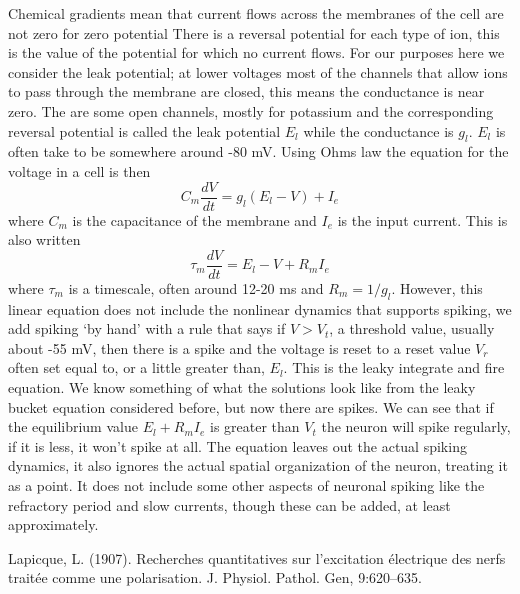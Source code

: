 \documentclass[12pt]{article}
\begin{document}
Chemical gradients mean that current flows across the membranes of the
cell are not zero for zero potential There is a reversal potential for
each type of ion, this is the value of the potential for which no
current flows. For our purposes here we consider the leak potential;
at lower voltages most of the channels that allow ions to pass through
the membrane are closed, this means the conductance is near zero. The
are some open channels, mostly for potassium and the corresponding
reversal potential is called the leak potential $E_l$ while the
conductance is $g_l$. $E_l$ is often take to be somewhere around -80
mV. Using Ohms law the equation for the voltage in a cell is then
\begin{equation}
  C_m\frac{dV}{dt}=g_l(E_l-V)+I_e
\end{equation}
where $C_m$ is the capacitance of the membrane and $I_e$ is the input current. This is also written
\begin{equation}
  \tau_m\frac{dV}{dt}=E_l-V+R_mI_e
\end{equation}
where $\tau_m$ is a timescale, often around 12-20 ms and
$R_m=1/g_l$. However, this linear equation does not include the
nonlinear dynamics that supports spiking, we add spiking `by hand'
with a rule that says if $V>V_t$, a threshold value, usually about -55
mV, then there is a spike and the voltage is reset to a reset value
$V_r$ often set equal to, or a little greater than, $E_l$. This is the
leaky integrate and fire equation. We know something of what the
solutions look like from the leaky bucket equation considered before,
but now there are spikes. We can see that if the equilibrium value
$E_l+R_mI_e$ is greater than $V_t$ the neuron will spike regularly, if
it is less, it won't spike at all. The equation leaves out the actual
spiking dynamics, it also ignores the actual spatial organization of
the neuron, treating it as a point. It does not include some other
aspects of neuronal spiking like the refractory period and slow
currents, though these can be added, at least approximately.


\begin{thebibliography}{99}
Lapicque, L. (1907). 
\newblock Recherches quantitatives sur l'excitation électrique des nerfs traitée comme une polarisation. 
\newblock J. Physiol. Pathol. Gen, 9:620--635.
\end{thebibliography}
\end{document}
